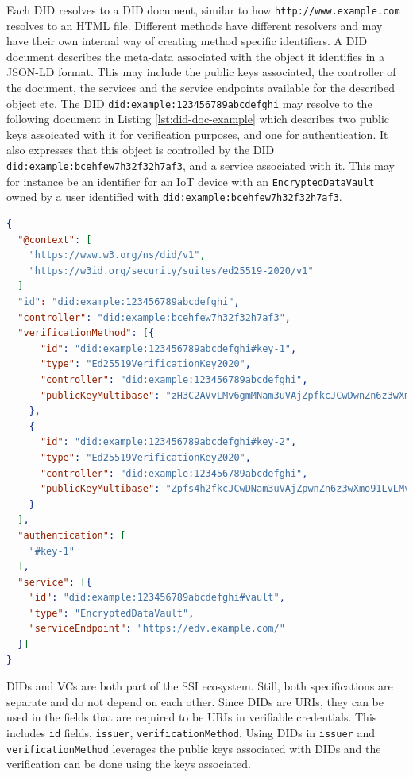 Each \acrshort{DID} resolves to a \acrshort{DID} document, similar to how \lstinline{http://www.example.com} resolves to an HTML file. Different methods have different resolvers and may have their own internal way of creating method specific identifiers. A \acrshort{DID} document describes the meta-data associated with the object it identifies in a \acrshort{JSON-LD} format. This may include the public keys associated, the controller of the document, the services and the service endpoints available for the described object etc. The \acrshort{DID} \lstinline{did:example:123456789abcdefghi} may resolve to the following document in Listing \ref{lst:did-doc-example} which describes two public keys assoicated with it for verification purposes, and one for authentication. It also expresses that this object is controlled by the \acrshort{DID} \lstinline{did:example:bcehfew7h32f32h7af3}, and a service associated with it. This may for instance be an identifier for an \acrshort{IoT} device with an \lstinline{EncryptedDataVault} owned by a user identified with \lstinline{did:example:bcehfew7h32f32h7af3}.

\begin{lstlisting}[language=json, label={lst:did-doc-example}, caption={Example \acrlong{DID} document \parencite{reed_sporny_longley_allen_grant_sabadello_2021}}]
{
  "@context": [
    "https://www.w3.org/ns/did/v1",
    "https://w3id.org/security/suites/ed25519-2020/v1"
  ]
  "id": "did:example:123456789abcdefghi",
  "controller": "did:example:bcehfew7h32f32h7af3",
  "verificationMethod": [{
      "id": "did:example:123456789abcdefghi#key-1",
      "type": "Ed25519VerificationKey2020", 
      "controller": "did:example:123456789abcdefghi",
      "publicKeyMultibase": "zH3C2AVvLMv6gmMNam3uVAjZpfkcJCwDwnZn6z3wXmqPV"
    }, 
    {
      "id": "did:example:123456789abcdefghi#key-2",
      "type": "Ed25519VerificationKey2020", 
      "controller": "did:example:123456789abcdefghi",
      "publicKeyMultibase": "Zpfs4h2fkcJCwDNam3uVAjZpwnZn6z3wXmo91LvLMv6A"
    }
  ],
  "authentication": [
    "#key-1"
  ],
  "service": [{
    "id": "did:example:123456789abcdefghi#vault",
    "type": "EncryptedDataVault",
    "serviceEndpoint": "https://edv.example.com/"
  }]
}
\end{lstlisting}

\acrshort{DID}s and \acrshort{VC}s are both part of the \acrfull{SSI} ecosystem. Still, both specifications are separate and do not depend on each other. Since \acrshort{DID}s are \acrshort{URI}s, they can be used in the fields that are required to be \acrshort{URI}s in verifiable credentials. This includes \lstinline{id} fields, \lstinline{issuer}, \lstinline{verificationMethod}. Using \acrshort{DID}s in \lstinline{issuer} and \lstinline{verificationMethod} leverages the public keys associated with \acrshort{DID}s and the verification can be done using the keys associated.
